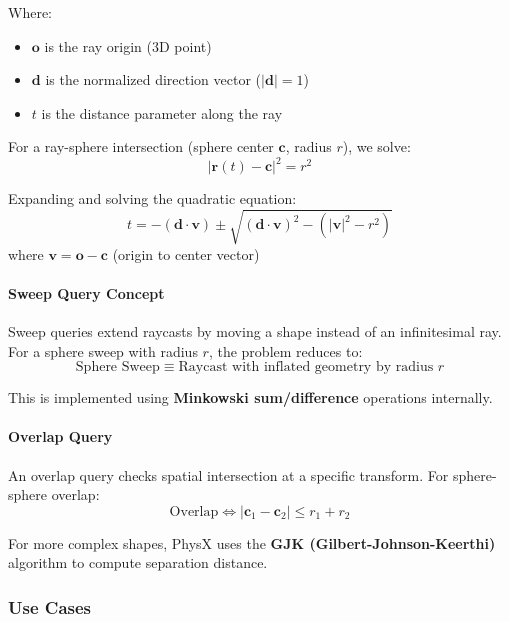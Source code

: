 Where:
\begin{itemize}
    \item $\mathbf{o}$ is the ray origin (3D point)
    \item $\mathbf{d}$ is the normalized direction vector ($|\mathbf{d}| = 1$)
    \item $t$ is the distance parameter along the ray
\end{itemize}

For a ray-sphere intersection (sphere center $\mathbf{c}$, radius $r$), we solve:
\begin{equation}
|\mathbf{r}(t) - \mathbf{c}|^2 = r^2
\end{equation}

Expanding and solving the quadratic equation:
\begin{equation}
t = -(\mathbf{d} \cdot \mathbf{v}) \pm \sqrt{(\mathbf{d} \cdot \mathbf{v})^2 - (|\mathbf{v}|^2 - r^2)}
\end{equation}
where $\mathbf{v} = \mathbf{o} - \mathbf{c}$ (origin to center vector)

\paragraph{Sweep Query Concept}

Sweep queries extend raycasts by moving a shape instead of an infinitesimal ray. For a sphere sweep with radius $r$, the problem reduces to:
\begin{equation}
\text{Sphere Sweep} \equiv \text{Raycast with inflated geometry by radius } r
\end{equation}

This is implemented using \textbf{Minkowski sum/difference} operations internally.

\paragraph{Overlap Query}

An overlap query checks spatial intersection at a specific transform. For sphere-sphere overlap:
\begin{equation}
\text{Overlap} \iff |\mathbf{c}_1 - \mathbf{c}_2| \leq r_1 + r_2
\end{equation}

For more complex shapes, PhysX uses the \textbf{GJK (Gilbert-Johnson-Keerthi)} algorithm to compute separation distance.

\subsubsection{Use Cases}

